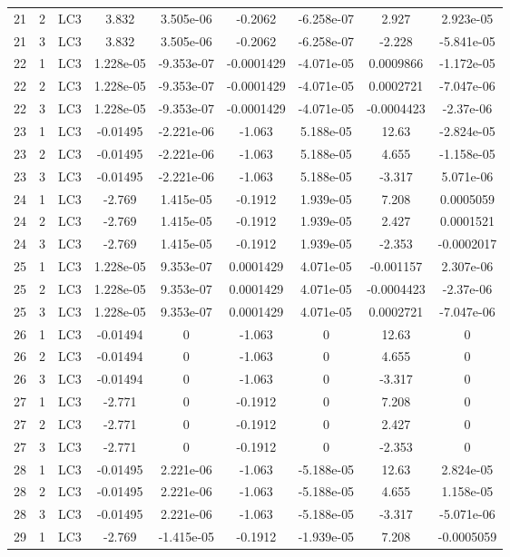 \documentclass{article}%
\begin{document}
\begin{longtable}{| c c c | c c c c c c |}
21&2&LC3&3.832&3.505e{-}06&{-}0.2062&{-}6.258e{-}07&2.927&2.923e{-}05\\%
21&3&LC3&3.832&3.505e{-}06&{-}0.2062&{-}6.258e{-}07&{-}2.228&{-}5.841e{-}05\\%
22&1&LC3&1.228e{-}05&{-}9.353e{-}07&{-}0.0001429&{-}4.071e{-}05&0.0009866&{-}1.172e{-}05\\%
22&2&LC3&1.228e{-}05&{-}9.353e{-}07&{-}0.0001429&{-}4.071e{-}05&0.0002721&{-}7.047e{-}06\\%
22&3&LC3&1.228e{-}05&{-}9.353e{-}07&{-}0.0001429&{-}4.071e{-}05&{-}0.0004423&{-}2.37e{-}06\\%
23&1&LC3&{-}0.01495&{-}2.221e{-}06&{-}1.063&5.188e{-}05&12.63&{-}2.824e{-}05\\%
23&2&LC3&{-}0.01495&{-}2.221e{-}06&{-}1.063&5.188e{-}05&4.655&{-}1.158e{-}05\\%
23&3&LC3&{-}0.01495&{-}2.221e{-}06&{-}1.063&5.188e{-}05&{-}3.317&5.071e{-}06\\%
24&1&LC3&{-}2.769&1.415e{-}05&{-}0.1912&1.939e{-}05&7.208&0.0005059\\%
24&2&LC3&{-}2.769&1.415e{-}05&{-}0.1912&1.939e{-}05&2.427&0.0001521\\%
24&3&LC3&{-}2.769&1.415e{-}05&{-}0.1912&1.939e{-}05&{-}2.353&{-}0.0002017\\%
25&1&LC3&1.228e{-}05&9.353e{-}07&0.0001429&4.071e{-}05&{-}0.001157&2.307e{-}06\\%
25&2&LC3&1.228e{-}05&9.353e{-}07&0.0001429&4.071e{-}05&{-}0.0004423&{-}2.37e{-}06\\%
25&3&LC3&1.228e{-}05&9.353e{-}07&0.0001429&4.071e{-}05&0.0002721&{-}7.047e{-}06\\%
26&1&LC3&{-}0.01494&0&{-}1.063&0&12.63&0\\%
26&2&LC3&{-}0.01494&0&{-}1.063&0&4.655&0\\%
26&3&LC3&{-}0.01494&0&{-}1.063&0&{-}3.317&0\\%
27&1&LC3&{-}2.771&0&{-}0.1912&0&7.208&0\\%
27&2&LC3&{-}2.771&0&{-}0.1912&0&2.427&0\\%
27&3&LC3&{-}2.771&0&{-}0.1912&0&{-}2.353&0\\%
28&1&LC3&{-}0.01495&2.221e{-}06&{-}1.063&{-}5.188e{-}05&12.63&2.824e{-}05\\%
28&2&LC3&{-}0.01495&2.221e{-}06&{-}1.063&{-}5.188e{-}05&4.655&1.158e{-}05\\%
28&3&LC3&{-}0.01495&2.221e{-}06&{-}1.063&{-}5.188e{-}05&{-}3.317&{-}5.071e{-}06\\%
29&1&LC3&{-}2.769&{-}1.415e{-}05&{-}0.1912&{-}1.939e{-}05&7.208&{-}0.0005059\\%

\end{longtable}
\end{document}
